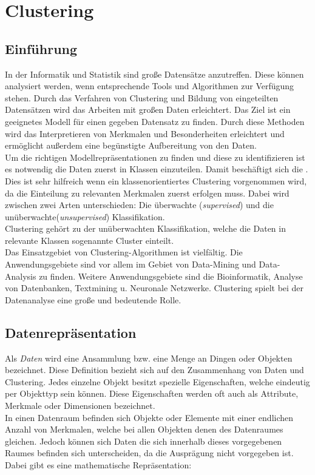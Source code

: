 \chapter{Clustering}\label{Clustering}
\section{Einführung}
In der Informatik und Statistik sind große Datensätze anzutreffen. Diese können analysiert werden, wenn entsprechende Tools und Algorithmen zur Verfügung stehen. Durch das Verfahren von Clustering und Bildung von eingeteilten Datensätzen wird das Arbeiten mit großen Daten erleichtert. Das Ziel ist ein geeignetes Modell für einen gegeben Datensatz zu finden. Durch diese Methoden wird das Interpretieren von Merkmalen und Besonderheiten erleichtert und ermöglicht außerdem eine begünstigte Aufbereitung von den Daten.\cite{fasulo99}\\Um die richtigen Modellrepräsentationen  zu finden und diese zu identifizieren ist es notwendig die Daten zuerst in Klassen einzuteilen. Damit beschäftigt sich die . Dies ist sehr hilfreich wenn ein klassenorientiertes Clustering vorgenommen wird, da die Einteilung zu relevanten Merkmalen zuerst erfolgen muss.
Dabei wird zwischen zwei Arten unterschieden: Die überwachte (\textit{supervised}) und die unüberwachte(\textit{unsupervised}) Klassifikation.\cite{fasulo99} \\
Clustering gehört zu der unüberwachten Klassifikation, welche die Daten in relevante Klassen sogenannte Cluster einteilt. \\
Das Einsatzgebiet von Clustering-Algorithmen ist vielfältig. Die Anwendungsgebiete sind vor allem im Gebiet von Data-Mining und Data-Analysis zu finden. Weitere Anwendungsgebiete sind die Bioinformatik, Analyse von Datenbanken, Textmining u. Neuronale Netzwerke. Clustering spielt bei der Datenanalyse eine große und bedeutende Rolle.\cite{fasulo99} 



\section{Datenrepräsentation}
Als \textsl{Daten} wird eine Ansammlung bzw. eine Menge an Dingen oder Objekten bezeichnet. Diese Definition bezieht sich auf den Zusammenhang von Daten und Clustering. Jedes einzelne Objekt besitzt spezielle Eigenschaften, welche eindeutig per Objekttyp sein können. Diese Eigenschaften werden oft auch als Attribute, Merkmale oder Dimensionen bezeichnet.\cite{pell91}\\In einen Datenraum befinden sich Objekte oder Elemente mit einer endlichen Anzahl von Merkmalen, welche bei allen Objekten denen des Datenraumes gleichen. Jedoch können sich Daten die sich innerhalb dieses vorgegebenen Raumes befinden sich unterscheiden, da die Ausprägung nicht vorgegeben ist. \cite{pell91}
Dabei gibt es eine mathematische Repräsentation:\\


